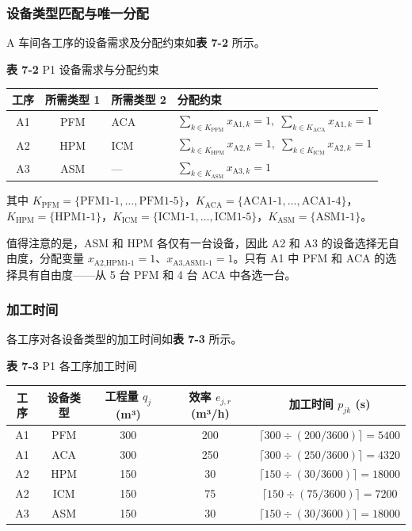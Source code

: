 \documentclass[UTF8,a4paper,12pt]{ctexart}
\begin{document}
\subsubsection{设备类型匹配与唯一分配}
A 车间各工序的设备需求及分配约束如\textbf{表 7-2} 所示。

\begin{center}
\textbf{表 7-2} P1 设备需求与分配约束
\begin{tabular}{ccll}
\toprule
工序 & 所需类型 1 & 所需类型 2 & 分配约束 \\
\midrule
A1 & PFM & ACA & $\sum_{k \in K_{\text{PFM}}} x_{\text{A1},k} = 1, \; \sum_{k \in K_{\text{ACA}}} x_{\text{A1},k} = 1$ \\
A2 & HPM & ICM & $\sum_{k \in K_{\text{HPM}}} x_{\text{A2},k} = 1, \; \sum_{k \in K_{\text{ICM}}} x_{\text{A2},k} = 1$ \\
A3 & ASM & — & $\sum_{k \in K_{\text{ASM}}} x_{\text{A3},k} = 1$ \\
\bottomrule
\end{tabular}
\end{center}

其中 $K_{\text{PFM}} = \{\text{PFM1-1}, \ldots, \text{PFM1-5}\}$，$K_{\text{ACA}} = \{\text{ACA1-1}, \ldots, \text{ACA1-4}\}$，$K_{\text{HPM}} = \{\text{HPM1-1}\}$，$K_{\text{ICM}} = \{\text{ICM1-1}, \ldots, \text{ICM1-5}\}$，$K_{\text{ASM}} = \{\text{ASM1-1}\}$。

值得注意的是，ASM 和 HPM 各仅有一台设备，因此 A2 和 A3 的设备选择无自由度，分配变量 $x_{\text{A2},\text{HPM1-1}} = 1$、$x_{\text{A3},\text{ASM1-1}} = 1$。只有 A1 中 PFM 和 ACA 的选择具有自由度——从 5 台 PFM 和 4 台 ACA 中各选一台。

\subsubsection{加工时间}
各工序对各设备类型的加工时间如\textbf{表 7-3} 所示。

\begin{center}
\textbf{表 7-3} P1 各工序加工时间
\begin{tabular}{ccccc}
\toprule
工序 & 设备类型 & 工程量 $q_j$ (m³) & 效率 $e_{j,r}$ (m³/h) & 加工时间 $p_{jk}$ (s) \\
\midrule
A1 & PFM & 300 & 200 & $\lceil 300 \div (200/3600) \rceil = 5400$ \\
A1 & ACA & 300 & 250 & $\lceil 300 \div (250/3600) \rceil = 4320$ \\
A2 & HPM & 150 & 30 & $\lceil 150 \div (30/3600) \rceil = 18000$ \\
A2 & ICM & 150 & 75 & $\lceil 150 \div (75/3600) \rceil = 7200$ \\
A3 & ASM & 150 & 30 & $\lceil 150 \div (30/3600) \rceil = 18000$ \\
\bottomrule
\end{tabular}
\end{center}
\end{document}
